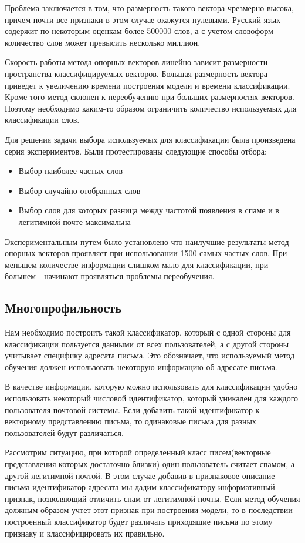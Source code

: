 Проблема заключается в том, что размерность такого вектора чрезмерно высока, причем
почти все признаки в этом случае окажутся нулевыми. Русский язык содержит по некоторым оценкам более 500000\cite{TUTIN} слов, а с
учетом словоформ количество слов может превысить несколько миллион.

Скорость работы метода опорных векторов линейно зависит размерности пространства классифицируемых векторов.
Большая размерность вектора приведет к увеличению времени построения модели и времени классификации.
Кроме того метод склонен к переобучению при больших размерностях векторов. Поэтому необходимо каким-то образом ограничить количество используемых для классификации слов.

Для решения задачи выбора используемых для классификации была произведена серия экспериментов.
Были протестированы следующие способы отбора:
\begin{itemize}
\item Выбор наиболее частых слов
\item Выбор случайно отобранных слов
\item Выбор слов для которых разница между частотой появления в спаме и в легитимной почте максимальна
\end{itemize}

Экспериментальным путем было установлено что наилучшие результаты метод опорных векторов проявляет при использовании 1500 самых частых слов. При меньшем количестве информации слишком мало для классификации, при большем - начинают проявляться проблемы переобучения.

\subsection{Многопрофильность}
\label{MULTIPROFILE}
Нам необходимо построить такой классификатор, который с одной стороны для классификации пользуется данными от  всех пользователей, а с другой стороны учитывает специфику адресата письма.  Это обозначает, что используемый метод обучения должен использовать некоторую информацию об адресате письма. 

В качестве информации, которую можно использовать для классификации удобно использовать некоторый числовой идентификатор, который уникален для каждого пользователя почтовой системы. Если добавить такой идентификатор к векторному представлению письма, то одинаковые письма для разных пользователей будут различаться. 

Рассмотрим ситуацию, при которой определенный класс писем(векторные представления которых достаточно близки) один пользователь считает спамом, а другой легитимной почтой.  В этом случае добавив в признаковое описание письма идентификатор адресата мы дадим классификатору информативный признак, позволяющий отличить спам от легитимной почты. Если метод обучения должным образом учтет этот признак при построении модели, то в последствии построенный классификатор будет различать приходящие письма по этому признаку и классифицировать их правильно. 

